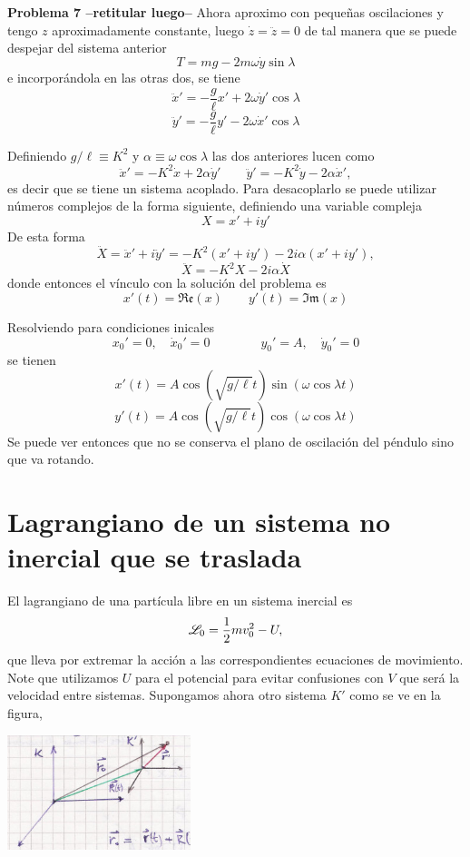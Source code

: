 \documentclass[10pt,oneside]{CBFT_book}
\begin{document}
\begin{ejemplo}{\bf Problema 7 --retitular luego--}
Ahora aproximo con pequeñas oscilaciones y tengo $z$ aproximadamente constante, luego $\dot{z} = \ddot{z} = 0$ de
tal manera que se puede despejar del sistema anterior 
\[
	T = m g - 2 m \omega \dot{y} \sin \lambda
\]
e incorporándola en las otras dos, se tiene 
\[
	\ddot{x}' = - \frac{g}{\ell} x' + 2 \omega \dot{y}' \cos \lambda
\]
\[
	\ddot{y}' = - \frac{g}{\ell} y' - 2 \omega \dot{x}' \cos \lambda 
\]

Definiendo $g/\ell \equiv K^2$ y $\alpha \equiv \omega \cos \lambda $ las dos anteriores lucen como 
\[
	\ddot{x}' = - K^2 \dot{x} + 2 \alpha \dot{y}' \qquad \ddot{y}' = - K^2 \dot{y} - 2 \alpha \dot{x}',
\]
es decir que se tiene un sistema acoplado. Para desacoplarlo se puede utilizar números complejos de la forma siguiente,
definiendo una variable compleja
\[
	X = x' + i y'
\]
De esta forma 
\[
	\ddot{X} = \ddot{x}' + i \ddot{y}' = - K^2 (x' + i y') - 2 i \alpha (x' + i y'),
\]
\[
	\ddot{X} = - K^2 X - 2 i \alpha \dot{X}
\]
donde entonces el vínculo con la solución del problema es 
\[
	x'(t) = \mathfrak{Re}(x) \qquad y'(t) = \mathfrak{Im}(x)
\]

Resolviendo para condiciones inicales
\[
	x_0' = 0, \quad \dot{x}_0' = 0 \qquad \qquad y_0' = A, \quad \dot{y}_0' = 0
\]
se tienen
\[
	x'(t) = A \cos ( \sqrt{g/\ell} t ) \sin( \omega \cos \lambda t )
\]
\[
	y'(t) = A \cos ( \sqrt{g/\ell} t ) \cos( \omega \cos \lambda t )
\]
Se puede ver entonces que no se conserva el plano de oscilación del péndulo sino que va rotando.
\end{ejemplo}


\section{Lagrangiano de un sistema no inercial que se traslada}


El lagrangiano de una partícula libre en un sistema inercial es
\[
	\mathscr{L}_0 = \frac 1 2 m v_0^2 - U,
\]
que lleva por extremar la acción a las correspondientes ecuaciones de movimiento.
Note que utilizamos $U$ para el potencial para evitar confusiones con $V$ que será la velocidad entre sistemas.
Supongamos ahora otro sistema $K'$ como se ve en la figura,

\includegraphics[width=0.4\textwidth]{images/fig_mc_no_inercial_ejemplo_1.jpg}
\end{document}
